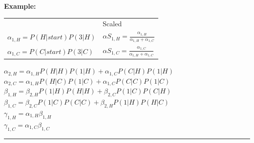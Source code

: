 \begin{minipage}{0.44\textwidth}
	\textbf{Example:}\\
	\begin{tabular}{ll}
											&	Scaled	\\
	$\alpha_{1,H}=P(H|start) P(3|H)$	&	$\alpha S_{1,H}= \displaystyle\frac{\alpha_{1,H}}{\alpha_{1,H}+\alpha_{1,C}} $ \\
	$\alpha_{1,C}=P(C|start) P(3|C)$	&	$\alpha S_{1,C}= \displaystyle\frac{\alpha_{1,C}}{\alpha_{1,H}+\alpha_{1,C}}$ \\
	\end{tabular}
	
	$\alpha_{2,H}=\alpha_{1,H}P(H|H)P(1|H) + \alpha_{1,C}P(C|H)P(1|H)$ \\
	$\alpha_{2,C}=\alpha_{1,H}P(H|C)P(1|C) + \alpha_{1,C}P(C|C)P(1|C)$ \\
	
	$\beta_{1,H}=\beta_{2,H}P(1|H)P(H|H) + \beta_{2,C}P(1|C)P(C|H)$ \\
	$\beta_{1,C}=\beta_{2,C}P(1|C)P(C|C) + \beta_{2,H}P(1|H)P(H|C)$ \\
	
	$\gamma_{1,H}=\alpha_{1,H}\beta_{1,H}$ \\
	$\gamma_{1,C}=\alpha_{1,C}\beta_{1,C}$ \\
 
	 
	
\end{minipage}
\hrule
\vspace{5mm}

